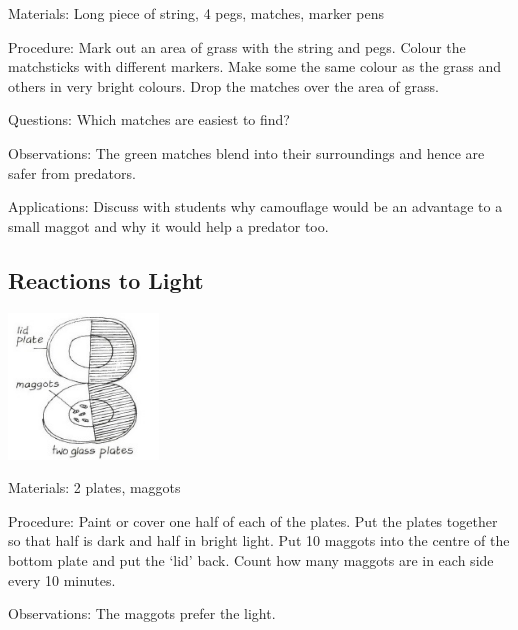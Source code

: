 \begin{multicols}{2}
\begin{description*}
\item[Materials:]{Long piece of string, 4 pegs, matches, marker pens}
\item[Procedure:]{Mark out an area of grass with
the string and pegs. Colour the
matchsticks with different markers. Make some the same
colour as the grass and others in
very bright colours. Drop the
matches over the area of grass.
}
\item[Questions:]{Which matches are easiest to
find?}
\item[Observations:]{The green matches blend into their surroundings and hence are safer from predators.}
\item[Applications:]{Discuss with students why
camouflage would be an
advantage to a small maggot and
why it would help a predator too.}
\end{description*}

\subsection{Reactions to Light} %

\begin{center}
\includegraphics[width=0.3\textwidth]{./img/vso/reactions-light.jpg}
\end{center}

\begin{description*}
\item[Materials:]{2 plates, maggots}
\item[Procedure:]{Paint or cover one half of each of
the plates. Put the plates together
so that half is dark and half in
bright light. Put 10 maggots into
the centre of the bottom plate
and put the `lid' back. Count how
many maggots are in each side
every 10 minutes.}
\item[Observations:]{The maggots prefer the light.}
\end{description*}


\end{multicols}
